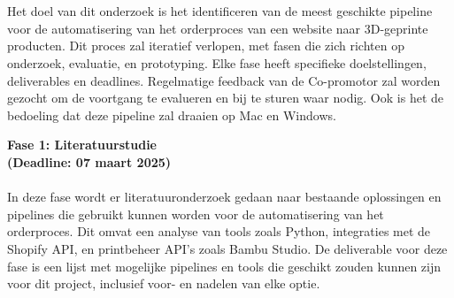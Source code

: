 

\chapter{}%
\label{ch:methodologie}


Het doel van dit onderzoek is het identificeren van de meest geschikte pipeline voor de automatisering van het orderproces van een website naar 3D-geprinte producten. Dit proces zal iteratief verlopen, met fasen die zich richten op onderzoek, evaluatie, en prototyping. Elke fase heeft specifieke doelstellingen, deliverables en deadlines. Regelmatige feedback van de Co-promotor zal worden gezocht om de voortgang te evalueren en bij te sturen waar nodig. Ook is het de bedoeling dat deze pipeline zal draaien op Mac en Windows.
\vspace{2em}

\textbf{Fase 1: Literatuurstudie}\\
\textbf{(Deadline: 07 maart 2025)}\\\\
In deze fase wordt er literatuuronderzoek gedaan naar bestaande oplossingen en pipelines die gebruikt kunnen worden voor de automatisering van het orderproces. Dit omvat een analyse van tools zoals Python, integraties met de Shopify API, en printbeheer API's zoals Bambu Studio. De deliverable voor deze fase is een lijst met mogelijke pipelines en tools die geschikt zouden kunnen zijn voor dit project, inclusief voor- en nadelen van elke optie.
\vspace{2em}

